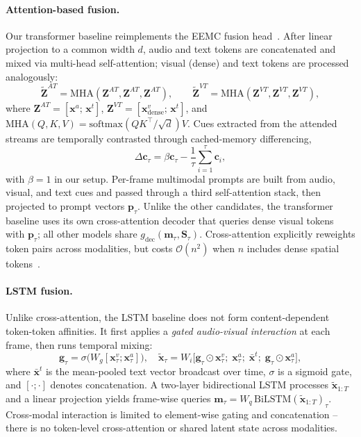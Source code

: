 \documentclass[a4paper,12pt]{extarticle}
\begin{document}
\paragraph{Attention-based fusion.}
Our transformer baseline reimplements the EEMC fusion head~\cite{wang2024refavs}. After linear projection to a common width $d$, audio and text tokens are concatenated and mixed via multi-head self-attention; visual (dense) and text tokens are processed analogously:
\begin{equation}
    \tilde{\mathbf{Z}}^{AT} = \mathrm{MHA}(\mathbf{Z}^{AT}, \mathbf{Z}^{AT}, \mathbf{Z}^{AT}), \qquad
    \tilde{\mathbf{Z}}^{VT} = \mathrm{MHA}(\mathbf{Z}^{VT}, \mathbf{Z}^{VT}, \mathbf{Z}^{VT}),
\end{equation}
where $\mathbf{Z}^{AT} = [\mathbf{x}^{a};\, \mathbf{x}^{t}]$, $\mathbf{Z}^{VT} = [\mathbf{x}^{v}_{\mathrm{dense}};\, \mathbf{x}^{t}]$, and $\mathrm{MHA}(Q,K,V)=\mathrm{softmax}(QK^\top/\sqrt{d})V$. Cues extracted from the attended streams are temporally contrasted through cached-memory differencing,
\begin{equation}
    \Delta \mathbf{c}_\tau = \beta \mathbf{c}_\tau - \frac{1}{\tau}\sum_{i=1}^{\tau}\mathbf{c}_i,
\end{equation}
with $\beta{=}1$ in our setup. Per-frame multimodal prompts are built from audio, visual, and text cues and passed through a third self-attention stack, then projected to prompt vectors $\mathbf{p}_\tau$. Unlike the other candidates, the transformer baseline uses its own cross-attention decoder that queries dense visual tokens with $\mathbf{p}_\tau$; all other models share $g_{\mathrm{dec}}(\mathbf{m}_\tau, \mathbf{S}_\tau)$. Cross-attention explicitly reweights token pairs across modalities, but costs $\mathcal{O}(n^2)$ when $n$ includes dense spatial tokens~\cite{tay2020efficient}.

\paragraph{LSTM fusion.}
Unlike cross-attention, the LSTM baseline does not form content-dependent token-token affinities. It first applies a \emph{gated audio-visual interaction} at each frame, then runs temporal mixing:
\begin{equation}
    \mathbf{g}_\tau = \sigma\!\big(W_g [\mathbf{x}^{v}_\tau; \mathbf{x}^{a}_\tau]\big), \quad
    \tilde{\mathbf{x}}_\tau = W_i \big[\mathbf{g}_\tau \odot \mathbf{x}^{v}_\tau;\; \mathbf{x}^{a}_\tau;\; \bar{\mathbf{x}}^{t};\; \mathbf{g}_\tau \odot \mathbf{x}^{a}_\tau\big],
\end{equation}
where $\bar{\mathbf{x}}^{t}$ is the mean-pooled text vector broadcast over time, $\sigma$ is a sigmoid gate, and $[\cdot;\cdot]$ denotes concatenation. A two-layer bidirectional LSTM processes $\tilde{\mathbf{x}}_{1:T}$ and a linear projection yields frame-wise queries $\mathbf{m}_\tau = W_q\,\mathrm{BiLSTM}(\tilde{\mathbf{x}}_{1:T})_\tau$. Cross-modal interaction is limited to element-wise gating and concatenation -- there is no token-level cross-attention or shared latent state across modalities.
\end{document}

